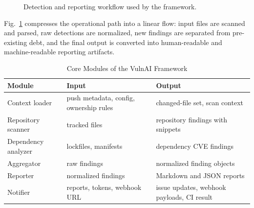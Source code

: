 \documentclass[conference]{IEEEtran}
\begin{document}
\begin{figure}[htbp]
\centering
{}
\caption{Detection and reporting workflow used by the framework.}
\label{fig:workflow}
\end{figure}

Fig.~\ref{fig:workflow} compresses the operational path into a linear flow: input files are scanned and parsed, raw detections are normalized, new findings are separated from pre-existing debt, and the final output is converted into human-readable and machine-readable reporting artifacts.

\begin{table}[htbp]
\caption{Core Modules of the VulnAI Framework}
\label{tab:modules}
\centering
\renewcommand{\arraystretch}{1.2}
\begin{tabular}{p{2.1cm}p{1.65cm}p{3.05cm}}
\toprule
\textbf{Module} & \textbf{Input} & \textbf{Output} \\
\midrule
Context loader & push metadata, config, ownership rules & changed-file set, scan context \\
Repository scanner & tracked files & repository findings with snippets \\
Dependency analyzer & lockfiles, manifests & dependency CVE findings \\
Aggregator & raw findings & normalized finding objects \\
Reporter & normalized findings & Markdown and JSON reports \\
Notifier & reports, tokens, webhook URL & issue updates, webhook payloads, CI result \\
\bottomrule
\end{tabular}
\end{table}
\end{document}
